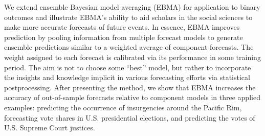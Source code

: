  We extend ensemble Bayesian model averaging (EBMA) for application to
  binary outcomes and illustrate EBMA's ability to aid scholars in the
  social sciences to make more accurate forecasts of future events.
  In essence, EBMA improves prediction by pooling information from
  multiple forecast models to generate ensemble predictions similar to
  a weighted average of component forecasts. The weight assigned to
  each forecast is calibrated via its performance in some training
  period. The aim is not to choose some ``best'' model, but rather to
  incorporate the insights and knowledge implicit in various
  forecasting efforts via statistical postprocessing.  After
  presenting the method, we show that EBMA increases the accuracy of
  out-of-sample forecasts relative to component models in three
  applied examples: predicting the occurrence of insurgencies around
  the Pacific Rim, forecasting vote shares in U.S. presidential
  elections, and predicting the votes of U.S. Supreme Court justices.